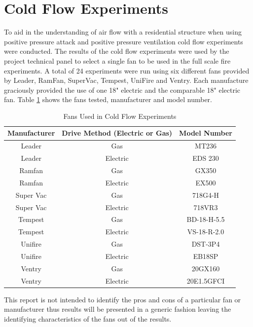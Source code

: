 \documentclass{article}
\begin{document}
\clearpage

\section{Cold Flow Experiments}
To aid in the understanding of air flow with a residential structure when using positive pressure attack and positive pressure ventilation cold flow experiments were conducted. The results of the cold flow experiments were used by the project technical panel to select a single fan to be used in the full scale fire experiments. A total of 24 experiments were run using six different fans provided by Leader, RamFan, SuperVac, Tempest, UniFire and Ventry. Each manufacture graciously provided the use of one 18" electric and the comparable 18" electric fan. Table \ref{table:cold_flow_Fans} shows the fans tested, manufacturer and model number. 

\begin{table}[H]
	\centering
	\caption{Fans Used in Cold Flow Experiments}
	\begin{tabular}{|c|c|c|}
		\hline
		Manufacturer & Drive Method (Electric or Gas) & Model Number \\ \hline \hline
		Leader & Gas & MT236 \\ \hline
		Leader & Electric & EDS 230 \\ \hline
		Ramfan & Gas & GX350 \\ \hline
		Ramfan & Electric & EX500 \\ \hline
		Super Vac & Gas & 718G4-H \\ \hline
		Super Vac & Electric & 718VR3 \\ \hline
		Tempest & Gas & BD-18-H-5.5 \\ \hline
		Tempest & Electric & VS-18-R-2.0 \\ \hline
		Unifire & Gas & DST-3P4 \\ \hline
		Unifire & Electric & EB18SP \\ \hline
		Ventry & Gas & 20GX160 \\ \hline
		Ventry & Electric & 20E1.5GFCI \\ \hline
	\end{tabular}
	\label{table:cold_flow_Fans}
\end{table}

This report is not intended to identify the pros and cons of a particular fan or manufacturer thus results will be presented in a generic fashion leaving the identifying characteristics of the fans out of the results. 
\end{document}
